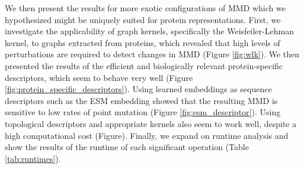 We then present the results for more exotic configurations of MMD which we
hypothesized might be uniquely suited for protein representations. First, we
investigate the applicability of graph kernels, specifically the
Weisfeiler-Lehman kernel, to graphs extracted from proteins, which revealed that
high levels of perturbations are required to detect changes in MMD (Figure
\ref{fig:wlk}). We then presented the results of the efficient and biologically
relevant protein-specific descriptors, which seem to behave very well (Figure
\ref{fig:protein_specific_descriptors}). Using learned embeddings as sequence descriptors
such as the ESM embedding showed that the resulting MMD is sensitive to
low rates of point mutation (Figure \ref{fig:esm_descriptor}). Using
topological descriptors and appropriate kernels also seem to work well, despite
a high computational cost (Figure). Finally, we expand on runtime analysis and show the results of the runtime
of each significant operation (Table \ref{tab:runtimes}).
